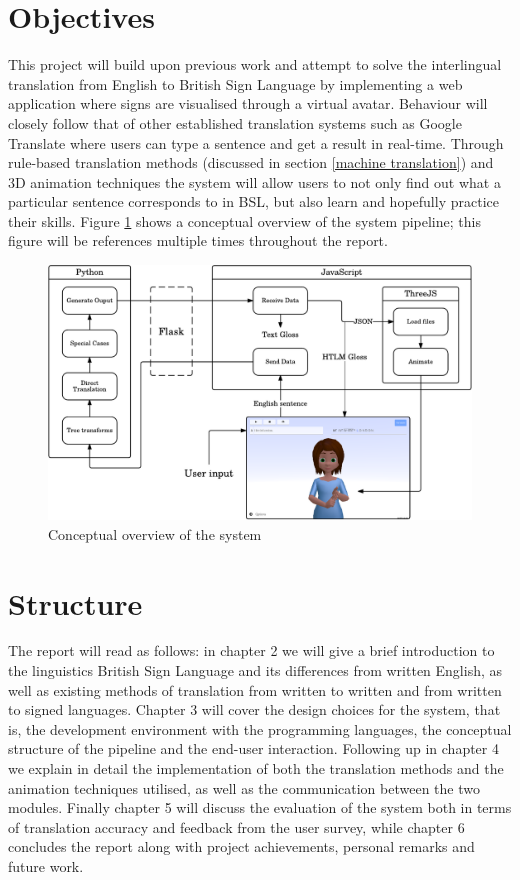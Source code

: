 \documentclass[12pt]{ociamthesis}  %
\begin{document}
\section{Objectives}
This project will build upon previous work and attempt to solve the interlingual translation from English to British Sign Language by implementing a web application where signs are visualised through a virtual avatar. Behaviour will closely follow that of other established translation systems such as Google Translate where users can type a sentence and get a result in real-time. Through rule-based translation methods (discussed in section \ref{machine translation}) and 3D animation techniques the system will allow users to not only find out what a particular sentence corresponds to in BSL, but also learn and hopefully practice their skills. Figure \ref{fig:sys-overview} shows a conceptual overview of the system pipeline; this figure will be references multiple times throughout the report.

\begin{figure}[h]
	\centering
    \includegraphics[scale=0.75]{system-overview}
    \caption{Conceptual overview of the system}
    \label{fig:sys-overview}
\end{figure}

\section{Structure}
The report will read as follows: in chapter 2 we will give a brief introduction to the linguistics British Sign Language and its differences from written English, as well as existing methods of translation from written to written and from written to signed languages. Chapter 3 will cover the design choices for the system, that is, the development environment with the programming languages, the conceptual structure of the pipeline and the end-user interaction. Following up in chapter 4 we explain in detail the implementation of both the translation methods and the animation techniques utilised, as well as the communication between the two modules. Finally chapter 5 will discuss the evaluation of the system both in terms of translation accuracy and feedback from the user survey, while chapter 6 concludes the report along with project achievements, personal remarks and future work.
\end{document}

